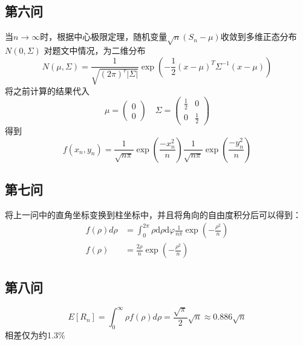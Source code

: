 \documentclass[a4paper]{ctexart}
\begin{document}
\subsection{第六问}
当$n\to\infty$时，根据中心极限定理，随机变量$\sqrt{n}\left(S_{n}-\mu\right)$收敛到多维正态分布$N(0,\Sigma)$
对题文中情况，为二维分布
\begin{equation}
N(\mu, \Sigma)=\frac{1}{\sqrt{(2 \pi)^{r}|\Sigma|}} \exp \left(-\frac{1}{2}(x-\mu)^{T} \Sigma^{-1}(x-\mu)\right)
\end{equation}
将之前计算的结果代入
\begin{equation}
\mu=\left( \begin{array}{l}{0} \\ {0}\end{array}\right) \quad \Sigma=\left( \begin{array}{ll}{\frac{1}{2}} & {0} \\ {0} & {\frac{1}{2}}\end{array}\right)
\end{equation}
得到
\begin{equation}f(x_n,y_n)
=\frac{1}{\sqrt{n \pi}} \exp \left(\frac{-x_{n}^{2}}{n}\right) \frac{1}{\sqrt{n \pi}} \exp \left(\frac{-y_{n}^{2}}{n}\right)
\end{equation}
\subsection{第七问}
将上一问中的直角坐标变换到柱坐标中，并且将角向的自由度积分后可以得到：
\begin{equation}
\begin{aligned}
f(\rho)d\rho &=\int_{0}^{2 \pi} \rho \mathrm{d} \rho \mathrm{d} \varphi \frac{1}{n \pi} \exp \left(-\frac{\rho^{2}}{n}\right)\\
f(\rho)&=\frac{2\rho}{n}\exp\left(-\frac{\rho^2}{n}\right)
\end{aligned}
\end{equation}
\subsection{第八问}
\begin{equation}
E[R_n]=\int_{0}^{\infty}\rho f(\rho)d\rho=\frac{\sqrt{\pi}}{2}\sqrt{n}\approx 0.886\sqrt{n}
\end{equation}
相差仅为约1.3\%
\end{document}
